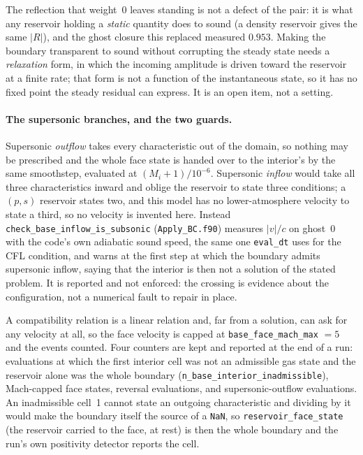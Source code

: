 \documentclass[english,a4paper]{my_memo}
\begin{document}
The reflection that weight~0 leaves standing is not a defect of the pair: it
is what any reservoir holding a \emph{static} quantity does to sound (a
density reservoir gives the same $|R|$), and the ghost closure this replaced
measured $0.953$. Making the boundary transparent to sound without
corrupting the steady state needs a \emph{relaxation} form, in which the
incoming amplitude is driven toward the reservoir at a finite rate; that
form is not a function of the instantaneous state, so it has no fixed point
the steady residual can express. It is an open item, not a setting.

\paragraph{The supersonic branches, and the two guards.}
Supersonic \emph{outflow} takes every characteristic out of the domain, so
nothing may be prescribed and the whole face state is handed over to the
interior's by the same smoothstep, evaluated at $(M_i+1)/10^{-6}$.
Supersonic \emph{inflow} would take all three characteristics inward and
oblige the reservoir to state three conditions; a $(p,s)$ reservoir states
two, and this model has no lower-atmosphere velocity to state a third, so no
velocity is invented here. Instead
\texttt{check\_base\_inflow\_is\_subsonic} (\texttt{Apply\_BC.f90}) measures
$|v|/c$ on ghost~0 with the code's own adiabatic sound speed, the same one
\texttt{eval\_dt} uses for the CFL condition, and warns at the first step at
which the boundary admits supersonic inflow, saying that the interior is
then not a solution of the stated problem. It is reported and not enforced:
the crossing is evidence about the configuration, not a numerical fault to
repair in place.

A compatibility relation is a linear relation and, far from a solution, can
ask for any velocity at all, so the face velocity is capped at
\texttt{base\_face\_mach\_max} $=5$ and the events counted. Four counters are
kept and reported at the end of a run: evaluations at which the first
interior cell was not an admissible gas state and the reservoir alone was
the whole boundary (\texttt{n\_base\_interior\_inadmissible}), Mach-capped
face states, reversal evaluations, and supersonic-outflow evaluations. An
inadmissible cell~1 cannot state an outgoing characteristic and dividing by
it would make the boundary itself the source of a \texttt{NaN}, so
\texttt{reservoir\_face\_state} (the reservoir carried to the face, at rest)
is then the whole boundary and the run's own positivity detector reports the
cell.
\end{document}

